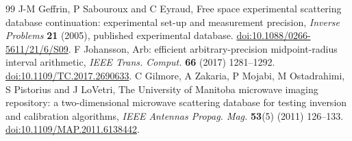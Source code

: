 \documentclass[anonymous,12pt]{iopjournal}
\theoremstyle{remark}\newtheorem{remark}[theorem]{Remark}
\numberwithin{equation}{section}
\begin{document}
\begin{thebibliography}{99}
 J-M Geffrin, P Sabouroux and C Eyraud, Free space experimental scattering database continuation: experimental set-up and measurement precision, \emph{Inverse Problems} \textbf{21} (2005), published experimental database. \href{https://doi.org/10.1088/0266-5611/21/6/S09}{doi:10.1088/0266-5611/21/6/S09}.
 F Johansson, Arb: efficient arbitrary-precision midpoint-radius interval arithmetic, \emph{IEEE Trans. Comput.} \textbf{66} (2017) 1281--1292. \href{https://doi.org/10.1109/TC.2017.2690633}{doi:10.1109/TC.2017.2690633}.
 C Gilmore, A Zakaria, P Mojabi, M Ostadrahimi, S Pistorius and J LoVetri, The University of Manitoba microwave imaging repository: a two-dimensional microwave scattering database for testing inversion and calibration algorithms, \emph{IEEE Antennas Propag. Mag.} \textbf{53}(5) (2011) 126--133. \href{https://doi.org/10.1109/MAP.2011.6138442}{doi:10.1109/MAP.2011.6138442}.
\end{thebibliography}
\end{document}

